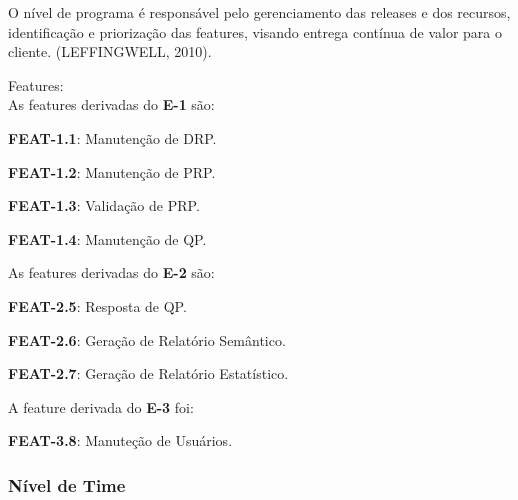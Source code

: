 			O nível de programa é responsável pelo gerenciamento das releases e dos recursos, identificação e priorização das features, visando entrega contínua de valor para o cliente. (LEFFINGWELL, 2010).

			\begin{itemize}
			{
				\item Features:\\
				As features derivadas do \textbf{E-1} são:
				\begin{itemize}
				{
					\item \textbf{FEAT-1.1}: Manutenção de DRP.\\

					\item \textbf{FEAT-1.2}: Manutenção de PRP.\\

					\item \textbf{FEAT-1.3}: Validação de PRP.\\

					\item \textbf{FEAT-1.4}: Manutenção de QP.\\
				}
				\end{itemize}

				As features derivadas do \textbf{E-2} são:
				\begin{itemize}
				{
					\item \textbf{FEAT-2.5}: Resposta de QP.\\

					\item \textbf{FEAT-2.6}: Geração de Relatório Semântico.\\

					\item \textbf{FEAT-2.7}: Geração de Relatório Estatístico.\\
				}
				\end{itemize}

				A feature derivada do \textbf{E-3} foi:
				\begin{itemize}
				{
					\item \textbf{FEAT-3.8}: Manuteção de Usuários.\\
				}
				\end{itemize}
			}
			\end{itemize}

		\subsubsection{Nível de Time}

